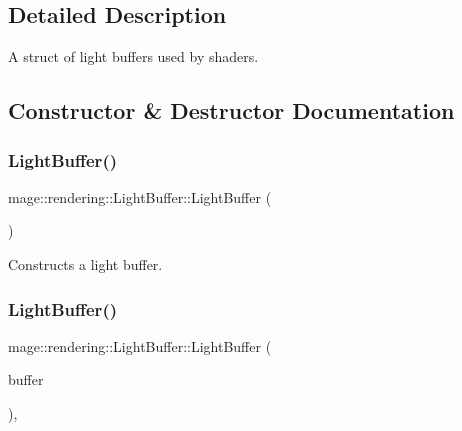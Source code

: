 \subsection{Detailed Description}
A struct of light buffers used by shaders. 

\subsection{Constructor \& Destructor Documentation}
\hypertarget{structmage_1_1rendering_1_1_light_buffer_ad31355f44f8e31f540fa40c81e659fca}{}\label{structmage_1_1rendering_1_1_light_buffer_ad31355f44f8e31f540fa40c81e659fca} 
\subsubsection{\texorpdfstring{Light\+Buffer()}{LightBuffer()}\hspace{0.1cm}{\footnotesize\ttfamily [1/3]}}
{\footnotesize\ttfamily mage\+::rendering\+::\+Light\+Buffer\+::\+Light\+Buffer (\begin{DoxyParamCaption}{ }\end{DoxyParamCaption})\hspace{0.3cm}{\ttfamily [noexcept]}}

Constructs a light buffer. \hypertarget{structmage_1_1rendering_1_1_light_buffer_ae5f4964ae3773e590a8fe07e3b6bcdfa}{}\label{structmage_1_1rendering_1_1_light_buffer_ae5f4964ae3773e590a8fe07e3b6bcdfa} 
\subsubsection{\texorpdfstring{Light\+Buffer()}{LightBuffer()}\hspace{0.1cm}{\footnotesize\ttfamily [2/3]}}
{\footnotesize\ttfamily mage\+::rendering\+::\+Light\+Buffer\+::\+Light\+Buffer (\begin{DoxyParamCaption}\item[{const \hyperlink{structmage_1_1rendering_1_1_light_buffer}{Light\+Buffer} \&}]{buffer }\end{DoxyParamCaption})\hspace{0.3cm}{\ttfamily [default]}, {\ttfamily [noexcept]}}


